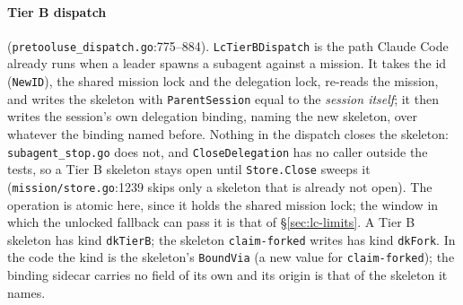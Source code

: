 \documentclass[a4paper,10pt,fleqn]{article}
\newcommand{\fpath}[1]{\texttt{#1}}
\newcommand{\field}[1]{\texttt{#1}}
\begin{document}
\paragraph{Tier B dispatch} (\fpath{pretooluse\_dispatch.go}:775--884).
\field{LcTierBDispatch} is the path Claude Code already runs when a leader
spawns a subagent against a mission. It takes the id (\field{NewID}), the
shared mission lock and the delegation lock, re-reads the mission, and
writes the skeleton with \field{ParentSession} equal to the \emph{session
itself}; it then writes the session's own delegation binding, naming the
new skeleton, over whatever the binding named before. Nothing in the
dispatch closes the skeleton: \fpath{subagent\_stop.go} does not, and
\field{CloseDelegation} has no caller outside the tests, so a Tier B
skeleton stays open until \field{Store.Close} sweeps it
(\fpath{mission/store.go}:1239 skips only a skeleton that is already not
open). The operation is atomic here, since it holds the shared mission
lock; the window in which the unlocked fallback can pass it is that of
\S\ref{sec:lc-limits}. A Tier B skeleton has kind \field{dkTierB}; the
skeleton \field{claim-forked} writes has kind \field{dkFork}. In the code
the kind is the skeleton's \field{BoundVia} (a new value for
\field{claim-forked}); the binding sidecar carries no field of its own and
its origin is that of the skeleton it names.
\end{document}
